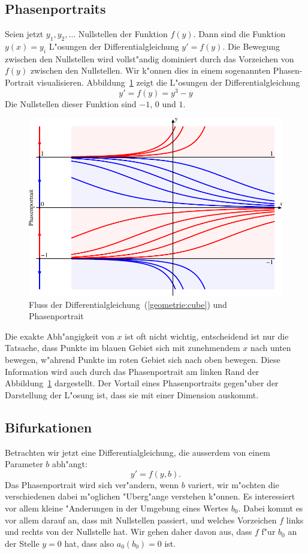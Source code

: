\subsection{Phasenportraits}
Seien jetzt $y_1,y_2,\dots$ Nullstellen der Funktion $f(y)$.
Dann sind die Funktion $y(x)=y_i$ L"osungen der Differentialgleichung
$y'=f(y)$.
Die Bewegung zwischen den Nullstellen wird vollst"andig dominiert durch
das Vorzeichen von $f(y)$ zwischen den Nullstellen.
Wir k"onnen dies in einem sogenannten Phasen-Portrait visualisieren.
Abbildung~\ref{geometrie:phasenportrait} zeigt die L"osungen der
Differentialgleichung
\begin{equation}
y'=f(y)=y^3-y
\label{geometrie:cube}
\end{equation}
Die Nullstellen dieser Funktion sind $-1$, $0$ und $1$.
\begin{figure}
\centering
\includegraphics{chapters/images/geometrie-14.pdf}
\caption{Fluss der Differentialgleichung~(\ref{geometrie:cube}) und
Phasenportrait
\label{geometrie:phasenportrait}}
\end{figure}
Die exakte Abh"angigkeit von $x$ ist oft nicht wichtig, entscheidend
ist nur die Tatsache, dass Punkte im blauen Gebiet sich mit zunehmendem
$x$ nach unten bewegen, w"ahrend Punkte im roten Gebiet sich nach
oben bewegen.
Diese Information wird auch durch das Phasenportrait am linken
Rand der Abbildung~\ref{geometrie:phasenportrait} dargestellt.
Der Vortail eines Phasenportraits gegen"uber der Darstellung
der L"osung ist, dass sie mit einer Dimension auskommt.

%
%
\subsection{Bifurkationen\label{geometrie:subsection:bifurkationen}}
Betrachten wir jetzt eine Differentialgleichung, die ausserdem von einem
Parameter $b$ abh"angt:
\[
y'=f(y,b).
\]
Das Phasenportrait wird sich ver"andern, wenn $b$ variert, wir
m"ochten die verschiedenen dabei m"oglichen "Uberg"ange verstehen
k"onnen.
Es interessiert vor allem kleine "Anderungen in der Umgebung eines
Wertes $b_0$.
Dabei kommt es vor allem darauf an, dass mit Nullstellen passiert, und
welches Vorzeichen $f$ links und rechts von der Nullstelle hat.
Wir gehen daher davon aus, dass $f$ f"ur $b_0$ an der Stelle $y=0$
hat, dass also $a_0(b_0)=0$ ist.

